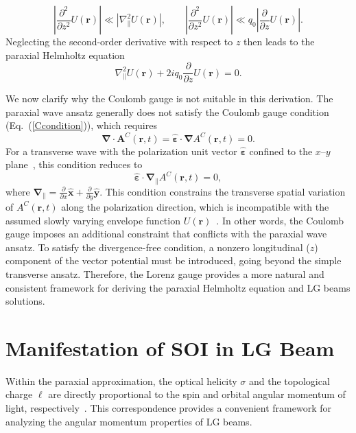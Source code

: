 \[
\left| \frac{\partial^2}{\partial z^2} U(\boldsymbol{r}) \right|
\ll
\left| \nabla^2_\parallel U(\boldsymbol{r}) \right|,
\qquad
\left| \frac{\partial^2}{\partial z^2} U(\boldsymbol{r}) \right|
\ll
q_0 \left| \frac{\partial}{\partial z} U(\boldsymbol{r}) \right|.
\]
Neglecting the second-order derivative with respect to $z$ then leads to the paraxial Helmholtz equation
\begin{equation}
\nabla^2_\parallel U(\boldsymbol{r}) + 2 i q_0 \frac{\partial}{\partial z} U(\boldsymbol{r}) = 0.
\label{PHE}
\end{equation}

We now clarify why the Coulomb gauge is not suitable in this derivation. The paraxial wave ansatz generally does not satisfy the Coulomb gauge condition (Eq.~(\ref{Ccondition})), which requires
\begin{equation}
\boldsymbol{\nabla} \cdot \boldsymbol{A}^C(\boldsymbol{r}, t)
=
\hat{\boldsymbol{\varepsilon}} \cdot \boldsymbol{\nabla} A^C(\boldsymbol{r}, t) = 0.
\label{Vio}
\end{equation}
For a transverse wave with the polarization unit vector $\hat{\boldsymbol{\varepsilon}}$ confined to the $x$--$y$ plane~\cite{griffiths2017introduction}, this condition reduces to
\begin{equation}
\hat{\boldsymbol{\varepsilon}} \cdot \boldsymbol{\nabla}_\parallel A^C(\boldsymbol{r}, t) = 0,
\end{equation}
where $\boldsymbol{\nabla}_\parallel = \frac{\partial}{\partial x}\hat{\boldsymbol{x}} + \frac{\partial}{\partial y}\hat{\boldsymbol{y}}$. This condition constrains the transverse spatial variation of $A^C(\boldsymbol{r}, t)$ along the polarization direction, which is incompatible with the assumed slowly varying envelope function $U(\boldsymbol{r})$~\cite{andrews2012angular}. In other words, the Coulomb gauge imposes an additional constraint that conflicts with the paraxial wave ansatz. To satisfy the divergence-free condition, a nonzero longitudinal ($z$) component of the vector potential must be introduced, going beyond the simple transverse ansatz. Therefore, the Lorenz gauge provides a more natural and consistent framework for deriving the paraxial Helmholtz equation and LG beams solutions.
%
%
%
%
%
%
\section{Manifestation of SOI in LG Beam}

Within the paraxial approximation, the optical helicity $\sigma$ and the topological charge $\ell$ are directly proportional to the spin and orbital angular momentum of light, respectively~\cite{bliokh2015transverse, barnett1994orbital}. This correspondence provides a convenient framework for analyzing the angular momentum properties of LG beams. 

